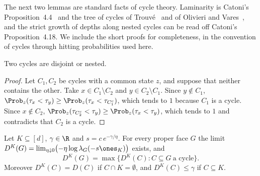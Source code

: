 The next two lemmas are standard facts of cycle theory. Laminarity is Catoni's
Proposition~4.4~\cite{catoni1999} and the tree of cycles of
Trouv\'e~\cite{trouve1996} and of Olivieri and Vares~\cite[Chapter~6]{olivierivares2005},
and the strict growth of depths along nested cycles can be read off Catoni's
Proposition~4.18. We include the short proofs for completeness, in the convention of
cycles through hitting probabilities used here.

\begin{lemma}[laminarity]\label{lem:laminar}
Two cycles are disjoint or nested.
\end{lemma}

\begin{proof}
Let $C_1,C_2$ be cycles with a common state $z$, and suppose that neither
contains the other. Take $x\in C_1\setminus C_2$ and $y\in C_2\setminus C_1$. Since
$y\notin C_1$, $\Prob_z(\tau_x<\tau_y)\ge\Prob_z(\tau_x<\tau_{C_1^c})$, which
tends to $1$ because $C_1$ is a cycle. Since $x\notin C_2$,
$\Prob_z(\tau_{C_2^c}<\tau_y)\ge\Prob_z(\tau_x<\tau_y)$, which tends to $1$ and
contradicts that $C_2$ is a cycle.
\end{proof}

\begin{lemma}\label{lem:killed-depth}
Let $K\subseteq[d]$, $\gamma\in\R$ and $s=c\,e^{-\gamma/\eta}$. For every proper
face $G$ the limit
$D^K(G)=\lim_{\eta\downarrow0}\bigl(-\eta\log\lambda_G(-s\ones_K)\bigr)$ exists, and
\[
 D^K(G)=\max\{D^K(C):C\subseteq G\ \text{a cycle}\}.
\]
Moreover $D^K(C)=D(C)$ if $C\cap K=\emptyset$, and $D^K(C)\le\gamma$ if
$C\subseteq K$.
\end{lemma}

